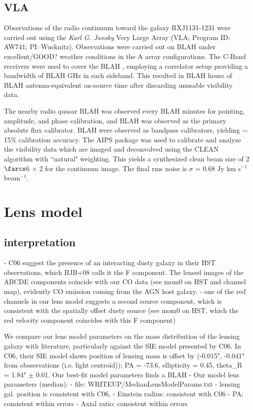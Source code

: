 \documentclass[]{emulateapj}
\begin{document}
\subsection{VLA} 

Observations of the radio continuum toward the
galaxy RXJ1131-1231 were carried out using the {\it Karl G. Jansky} Very Large 
Array (VLA; Program ID: AW741; PI: Wucknitz).
Observations were carried out on BLAH under excellent/GOOD? weather
conditions in the A array configurations. The C-Band receivers were used to 
cover the BLAH
, employing a correlator setup providing a bandwidth of BLAH GHz in each
sideband. This resulted in BLAH hours of BLAH antenna-equivalent on-source time
after 
discarding unusable visibility data.

The nearby radio quasar BLAH was observed every BLAH minutes for
pointing, amplitude, and phase calibration, and BLAH was observed as the
primary
absolute flux calibrator. BLAH were observed as bandpass calibrators, yielding
$\sim
$15\% calibration accuracy.
The AIPS package was used to calibrate and analyze the visibility data which
are imaged and deconvolved using
the CLEAN algorithm with ``natural" weighting. This yields a synthesized clean
beam size of 2$\farcs$6 $\times$ 2 for the continuum image. The final
rms 
noise is $\sigma$ = 0.68 Jy km s$^{-1}$ beam$^{-1}$.




\section{ Lens model}

\subsection{interpretation}
- C06 suggest the presence of an interacting dusty galaxy in their HST
observations, which BJB+08 calls it the F component. The lensed images of the
ABCDE 
components coincide with our CO data (see mom0 on HST and channel map),
evidently CO emission coming from the AGN host galaxy. 
- one of the red channels in our lens model suggests a second source component,
which is consistent with the spatially offset dusty source (see mom0 on HST,
which 
the red velocity component coincides with this F component)

We compare our lens model parameters on the mass distribution of the lensing
galaxy with literature, particularly against the SIE model presented by C06. 
In C06, their SIE model shows position of lensing mass is offset by (-0.015",
-0.041" from obsservations (i.e. light centroid)); PA = -73.6, ellipticity = 0.45,
theta\_R = 1.84" $\pm$ 0.01. 
Our best-fit model parameters finds a BLAH
	- Our model lens parameters (median):
		- file: WRITEUP/MedianLensModelParams.txt
		- lensing gal. position is consistent with C06, 
		- Einstein radius: consistent with C06
		- PA: consistent within errors
		- Axial ratio: consistent within errors
\end{document}
